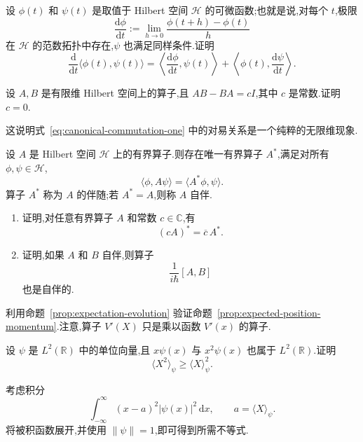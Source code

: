 \begin{exercise}\label{ex:inner-product-derivative}
设 \(\phi(t)\) 和 \(\psi(t)\) 是取值于 Hilbert 空间 \(\mathcal{H}\) 的可微函数;也就是说,对每个 \(t\),极限
\[
\frac{\mathrm{d}\phi}{\mathrm{d}t}
:=\lim_{h\to0}\frac{\phi(t+h)-\phi(t)}{h}
\]
在 \(\mathcal{H}\) 的范数拓扑中存在,\(\psi\) 也满足同样条件.证明
\[
\frac{\mathrm{d}}{\mathrm{d}t}\langle\phi(t),\psi(t)\rangle
=\left\langle\frac{\mathrm{d}\phi}{\mathrm{d}t},\psi(t)\right\rangle
+\left\langle\phi(t),\frac{\mathrm{d}\psi}{\mathrm{d}t}\right\rangle.
\]
\end{exercise}

\begin{exercise}\label{ex:finite-dimensional-commutator}
设 \(A,B\) 是有限维 Hilbert 空间上的算子,且 \(AB-BA=cI\),其中 \(c\) 是常数.证明 \(c=0\).

\begin{note}
这说明式~\eqref{eq:canonical-commutation-one} 中的对易关系是一个纯粹的无限维现象.
\end{note}
\end{exercise}

\begin{exercise}\label{ex:adjoint-commutator}
设 \(A\) 是 Hilbert 空间 \(\mathcal{H}\) 上的有界算子.则存在唯一有界算子 \(A^{*}\),满足对所有 \(\phi,\psi\in\mathcal{H}\),
\[
\langle\phi,A\psi\rangle=\langle A^{*}\phi,\psi\rangle.
\]
算子 \(A^{*}\) 称为 \(A\) 的伴随;若 \(A^{*}=A\),则称 \(A\) 自伴.
\begin{enumerate}
\item 证明,对任意有界算子 \(A\) 和常数 \(c\in\mathbb{C}\),有
\[
(cA)^{*}=\overline c\,A^{*}.
\]
\item 证明,如果 \(A\) 和 \(B\) 自伴,则算子
\[
\frac{1}{i\hbar}[A,B]
\]
也是自伴的.
\end{enumerate}
\end{exercise}

\begin{exercise}\label{ex:verify-expected-motion}
利用命题~\ref{prop:expectation-evolution} 验证命题~\ref{prop:expected-position-momentum}.注意,算子 \(V'(X)\) 只是乘以函数 \(V'(x)\) 的算子.
\end{exercise}

\begin{exercise}\label{ex:position-variance}
设 \(\psi\) 是 \(L^{2}(\mathbb{R})\) 中的单位向量,且 \(x\psi(x)\) 与 \(x^{2}\psi(x)\) 也属于 \(L^{2}(\mathbb{R})\).证明
\[
\langle X^{2}\rangle_{\psi}\ge\langle X\rangle_{\psi}^{2}.
\]
\begin{solution}
考虑积分
\[
\int_{-\infty}^{\infty}(x-a)^{2}|\psi(x)|^{2}\,\mathrm{d}x,
\qquad a=\langle X\rangle_{\psi}.
\]
将被积函数展开,并使用 \(\|\psi\|=1\),即可得到所需不等式.
\end{solution}
\end{exercise}

